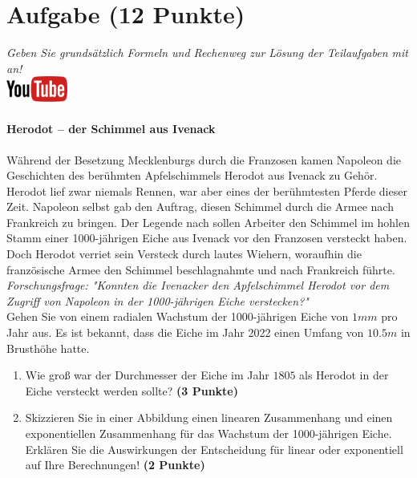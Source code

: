 \documentclass[a4paper, 10pt]{scrartcl}\usepackage[]{graphicx}\usepackage[]{xcolor}
\begin{document}
\section{Aufgabe \hfill (12 Punkte)}

\textit{Geben Sie grunds{\"a}tzlich Formeln und Rechenweg zur L{\"o}sung der
  Teilaufgaben mit an!} \\[1Ex]

\hfill\href{https://youtu.be/Fu8kN0Uj13Y}{\includegraphics[width =
  2cm]{img/youtube}} %
\hspace{2Ex}

\paragraph{Herodot – der Schimmel aus Ivenack}

W{\"a}hrend der Besetzung Mecklenburgs durch die Franzosen kamen Napoleon die
Geschichten des ber{\"u}hmten Apfelschimmels Herodot aus Ivenack zu
Geh{\"o}r. Herodot lief zwar niemals Rennen, war aber eines der ber{\"u}hmtesten
Pferde dieser Zeit. Napoleon selbst gab den Auftrag, diesen
Schimmel durch die Armee nach Frankreich zu bringen. Der Legende nach
sollen Arbeiter den Schimmel im hohlen Stamm einer 1000-j{\"a}hrigen Eiche aus Ivenack vor
den Franzosen versteckt haben. Doch Herodot verriet sein Versteck durch
lautes Wiehern, woraufhin die franz{\"o}sische Armee den Schimmel
beschlagnahmte und nach Frankreich f{\"u}hrte. \\



\textit{Forschungsfrage: "Konnten die Ivenacker den Apfelschimmel Herodot
  vor dem Zugriff von Napoleon in der 1000-j{\"a}hrigen Eiche verstecken?"} \\

Gehen Sie von einem radialen Wachstum der 1000-j{\"a}hrigen Eiche von
$1mm$ pro Jahr aus. Es ist bekannt, dass die Eiche im
Jahr 2022 einen Umfang von $10.5m$ in Brusth{\"o}he hatte.

\begin{enumerate}
\item Wie gro{\ss} war der Durchmesser der Eiche im Jahr $1805$ als
  Herodot in der Eiche versteckt werden sollte?
  \textbf{(3 Punkte)}
\item Skizzieren Sie in einer Abbildung einen linearen Zusammenhang und einen
exponentiellen Zusammenhang f{\"u}r das Wachstum der 1000-j{\"a}hrigen Eiche. Erkl{\"a}ren Sie die
Auswirkungen der Entscheidung f{\"u}r linear oder exponentiell auf Ihre
Berechnungen! \textbf{(2 Punkte)}
\end{enumerate}
 
\end{document}

